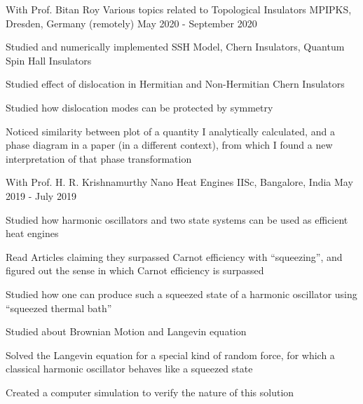 

\begin{cventries}
	
\cventry
{With Prof. Bitan Roy} %
{Various topics related to Topological Insulators} %
{MPIPKS, Dresden, Germany (remotely)} %
{May 2020 - September 2020} %
{
	\begin{cvitems} %
		\item {Studied and numerically implemented SSH Model, Chern Insulators, Quantum Spin Hall Insulators}
		\item {Studied effect of dislocation in Hermitian and Non-Hermitian Chern Insulators}
		\item {Studied how dislocation modes can be protected by symmetry}
		\item {Noticed similarity between plot of a quantity I analytically calculated, and a phase diagram in a paper (in a different context), from which I found a new interpretation of that phase transformation}
	\end{cvitems}
}

  \cventry
    {With Prof. H. R. Krishnamurthy} %
    {Nano Heat Engines} %
    {IISc, Bangalore, India} %
    {May 2019 - July 2019} %
    {
      \begin{cvitems} %
        \item {Studied how harmonic oscillators and two state systems can be used as efficient heat engines}
        \item {Read Articles claiming they surpassed Carnot efficiency with ``squeezing'', and figured out the sense in which Carnot efficiency is surpassed}
        \item {Studied how one can produce such a squeezed state of a harmonic oscillator using ``squeezed thermal bath''}
        \item {Studied about Brownian Motion and Langevin equation}
        \item {Solved the Langevin equation for a special kind of random force, for which a classical harmonic oscillator behaves like a squeezed state}
        \item {Created a computer simulation to verify the nature of this solution}
      \end{cvitems}
    }


\end{cventries}
